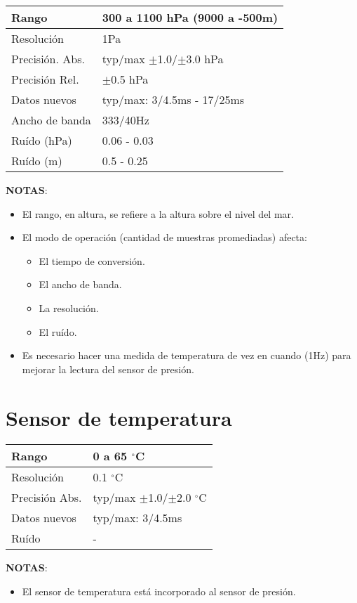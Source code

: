 \begin{table}[H]
\begin{center}
\begin{tabular}{|p{3cm}|p{6.5cm}|}
\hline
Rango & 300 a 1100 hPa (9000 a -500m)\\
\hline
Resoluci\'on &  1Pa\\
\hline
Precisi\'on. Abs. & typ/max $\pm$1.0/$\pm$3.0 hPa \\
\hline
Precisi\'on Rel. & $\pm$0.5 hPa \\
\hline
Datos nuevos &  typ/max: 3/4.5ms - 17/25ms\\
\hline
Ancho de banda &  333/40Hz\\
\hline
Ru\'ido (hPa) &  0.06 - 0.03\\
\hline
Ru\'ido (m) & 0.5 - 0.25 \\
\hline
\end{tabular}
\label{tab:barometro}
\end{center}
\end{table}

\textbf{NOTAS}:
\begin{itemize}
\item El rango, en altura, se refiere a la altura sobre el nivel del mar.
\item El modo de operaci\'on (cantidad de muestras promediadas) afecta:
  \begin{itemize}
  \item El tiempo de conversi\'on.
  \item El ancho de banda.
  \item La resoluci\'on.
  \item El ru\'ido.
  \end{itemize}
\item Es necesario hacer una medida de temperatura de vez en cuando (1Hz) para mejorar la lectura del sensor de presi\'on.
\end{itemize}

\section{Sensor de temperatura}

\begin{table}[H]
\begin{center}
\begin{tabular}{|p{3cm}|p{6.5cm}|}
\hline
Rango & 0 a 65 $^\circ$C\\
\hline
Resoluci\'on &  0.1 $^\circ$C\\
\hline
Precisi\'on Abs. & typ/max $\pm$1.0/$\pm$2.0 $^\circ$C\\
\hline
Datos nuevos &  typ/max: 3/4.5ms\\
\hline
Ru\'ido & - \\
\hline
\end{tabular}
\label{tab:temp}
\end{center}
\end{table}

\textbf{NOTAS}:
\begin{itemize}
\item El sensor de temperatura est\'a incorporado al sensor de presi\'on.
\end{itemize}


